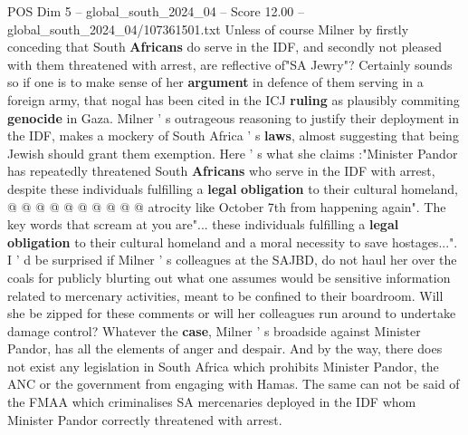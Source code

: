 \begin{textsample}{POS Dim 5 – global\_south\_2024\_04 – Score 12.00 – global\_south\_2024\_04/107361501.txt}
Unless of course Milner by firstly conceding that South \textbf{Africans} do serve in the IDF, and secondly not pleased with them threatened with arrest, are reflective of"SA Jewry"?
Certainly sounds so if one is to make sense of her \textbf{argument} in defence of them serving in a foreign army, that nogal has been cited in the ICJ \textbf{ruling} as plausibly commiting \textbf{genocide} in Gaza.
Milner ' s outrageous reasoning to justify their deployment in the IDF, makes a mockery of South Africa ' s \textbf{laws}, almost suggesting that being Jewish should grant them exemption.
Here ' s what she claims :"Minister Pandor has repeatedly threatened South \textbf{Africans} who serve in the IDF with arrest, despite these individuals fulfilling a \textbf{legal} \textbf{obligation} to their cultural homeland, @ @ @ @ @ @ @ @ @ @ atrocity like October 7th from happening again".
The key words that scream at you are"... these individuals fulfilling a \textbf{legal} \textbf{obligation} to their cultural homeland and a moral necessity to save hostages...".
I ' d be surprised if Milner ' s colleagues at the SAJBD, do not haul her over the coals for publicly blurting out what one assumes would be sensitive information related to mercenary activities, meant to be confined to their boardroom.
Will she be zipped for these comments or will her colleagues run around to undertake damage control?
Whatever the \textbf{case}, Milner ' s broadside against Minister Pandor, has all the elements of anger and despair.
And by the way, there does not exist any legislation in South Africa which prohibits Minister Pandor, the ANC or the government from engaging with Hamas.
The same can not be said of the FMAA which criminalises SA mercenaries deployed in the IDF whom Minister Pandor correctly threatened with arrest.

\end{textsample}
